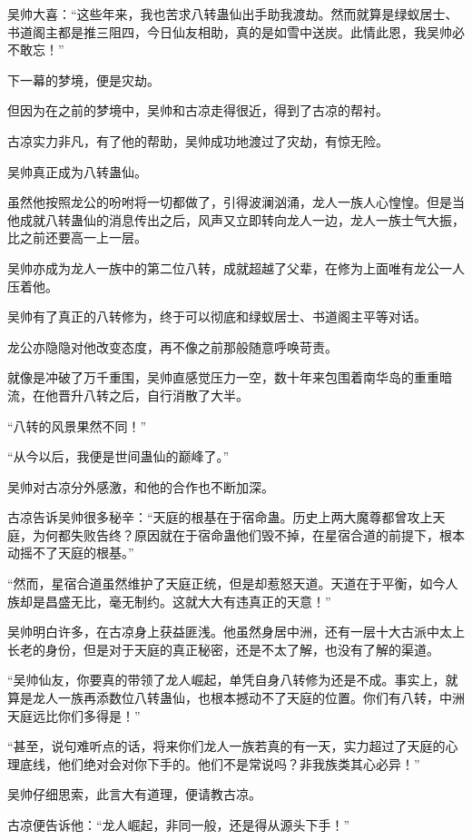\begin{this_body}
吴帅大喜：“这些年来，我也苦求八转蛊仙出手助我渡劫。然而就算是绿蚁居士、书道阁主都是推三阻四，今日仙友相助，真的是如雪中送炭。此情此恩，我吴帅必不敢忘！”

下一幕的梦境，便是灾劫。

但因为在之前的梦境中，吴帅和古凉走得很近，得到了古凉的帮衬。

古凉实力非凡，有了他的帮助，吴帅成功地渡过了灾劫，有惊无险。

吴帅真正成为八转蛊仙。

虽然他按照龙公的吩咐将一切都做了，引得波澜汹涌，龙人一族人心惶惶。但是当他成就八转蛊仙的消息传出之后，风声又立即转向龙人一边，龙人一族士气大振，比之前还要高一上一层。

吴帅亦成为龙人一族中的第二位八转，成就超越了父辈，在修为上面唯有龙公一人压着他。

吴帅有了真正的八转修为，终于可以彻底和绿蚁居士、书道阁主平等对话。

龙公亦隐隐对他改变态度，再不像之前那般随意呼唤苛责。

就像是冲破了万千重围，吴帅直感觉压力一空，数十年来包围着南华岛的重重暗流，在他晋升八转之后，自行消散了大半。

“八转的风景果然不同！”

“从今以后，我便是世间蛊仙的巅峰了。”

吴帅对古凉分外感激，和他的合作也不断加深。

古凉告诉吴帅很多秘辛：“天庭的根基在于宿命蛊。历史上两大魔尊都曾攻上天庭，为何都失败告终？原因就在于宿命蛊他们毁不掉，在星宿合道的前提下，根本动摇不了天庭的根基。”

“然而，星宿合道虽然维护了天庭正统，但是却惹怒天道。天道在于平衡，如今人族却是昌盛无比，毫无制约。这就大大有违真正的天意！”

吴帅明白许多，在古凉身上获益匪浅。他虽然身居中洲，还有一层十大古派中太上长老的身份，但是对于天庭的真正秘密，还是不太了解，也没有了解的渠道。

“吴帅仙友，你要真的带领了龙人崛起，单凭自身八转修为还是不成。事实上，就算是龙人一族再添数位八转蛊仙，也根本撼动不了天庭的位置。你们有八转，中洲天庭远比你们多得是！”

“甚至，说句难听点的话，将来你们龙人一族若真的有一天，实力超过了天庭的心理底线，他们绝对会对你下手的。他们不是常说吗？非我族类其心必异！”

吴帅仔细思索，此言大有道理，便请教古凉。

古凉便告诉他：“龙人崛起，非同一般，还是得从源头下手！”


\end{this_body}
